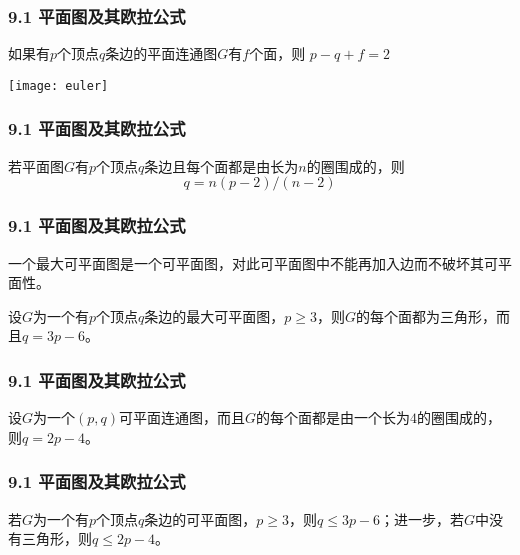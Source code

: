 \documentclass{beamer}
\begin{document}
\begin{CJK}{UTF8}{gbsn}
\begin{frame}
  \frametitle{9.1 平面图及其欧拉公式}
  \begin{Thm1}
    如果有$p$个顶点$q$条边的平面连通图$G$有$f$个面，则
      $p - q + f = 2$
  \end{Thm1}
\vspace{1cm}
\centering
    \texttt{[image: euler]}
\end{frame}

\begin{frame}
  \frametitle{9.1 平面图及其欧拉公式}
  \begin{Cor}
    若平面图$G$有$p$个顶点$q$条边且每个面都是由长为$n$的圈围成的，则
    \begin{equation*}
      q = n(p-2)/(n-2)
    \end{equation*}
  \end{Cor}
\end{frame}
\begin{frame}
  \frametitle{9.1 平面图及其欧拉公式}
一个\alert{最大可平面图}是一个可平面图，对此可平面图中不能再加入边而不破坏其可平面性。
  \begin{Cor}
    设$G$为一个有$p$个顶点$q$条边的最大可平面图，$p \geq 3$，则$G$的每个面都为三角形，而且$q=3p-6$。
  \end{Cor}
\end{frame}
\begin{frame}
  \frametitle{9.1 平面图及其欧拉公式}
  \begin{Cor}
    设$G$为一个$(p,q)$可平面连通图，而且$G$的每个面都是由一个长为$4$的圈围成的，则$q=2p-4$。
  \end{Cor}
\end{frame}
\begin{frame}
  \frametitle{9.1 平面图及其欧拉公式}
  \begin{Cor}
    若$G$为一个有$p$个顶点$q$条边的可平面图，$p\geq 3$，则$q \leq 3p - 6$；进一步，若$G$中没有三角形，则$q \leq 2p -4$。
  \end{Cor}
  
      \pause
      \centering
\end{frame}
\end{CJK}
\end{document}
